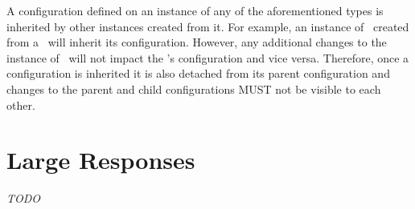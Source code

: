 A configuration defined on an instance of any of the aforementioned types is inherited by other instances created from it. For example, an instance of \ResourceUri\ created from a \Client\ will inherit its configuration. However, any additional changes to the instance of \ResourceUri\ will not impact the \Client's configuration and vice versa. Therefore, once a configuration is inherited it is also detached from its parent configuration and changes to the parent and child configurations MUST not be visible to each other.

\section{Large Responses}

\emph{TODO}









